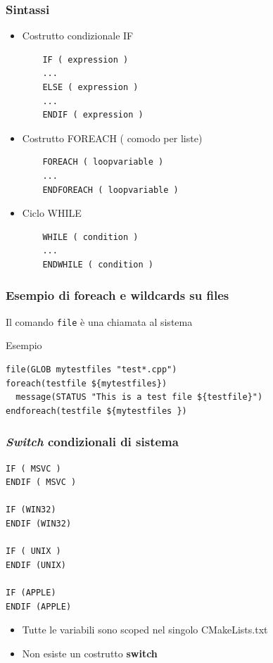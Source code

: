 \documentclass[10pt] {beamer}
\begin{document}
\begin{frame}[fragile]
	\frametitle{Sintassi}
\begin{itemize}
 \item Costrutto condizionale IF
	\begin{verbatim}
	IF ( expression )
	...
	ELSE ( expression )
	...
	ENDIF ( expression )
	\end{verbatim}
\item Costrutto FOREACH ( comodo per liste)
	\begin{verbatim}
	FOREACH ( loopvariable )
	...
	ENDFOREACH ( loopvariable )
	\end{verbatim}
\item Ciclo WHILE
	\begin{verbatim}
	WHILE ( condition )
	...
	ENDWHILE ( condition )
	\end{verbatim}
\end{itemize}
\end{frame}


\begin{frame}[fragile]
\frametitle{Esempio di foreach e wildcards su files}
Il comando \texttt{file} è una chiamata al sistema
\begin{block}{Esempio}
\begin{small}
\begin{verbatim}
file(GLOB mytestfiles "test*.cpp")
foreach(testfile ${mytestfiles})
  message(STATUS "This is a test file ${testfile}")
endforeach(testfile ${mytestfiles })
\end{verbatim}
\end{small}
\end{block}
\end{frame}


\begin{frame}[fragile]
\frametitle{\emph{Switch} condizionali di sistema}
\begin{verbatim}
IF ( MSVC )
ENDIF ( MSVC )

IF (WIN32)
ENDIF (WIN32)
 		
IF ( UNIX )
ENDIF (UNIX)
 		
IF (APPLE)
ENDIF (APPLE)
\end{verbatim}
\begin{itemize}
\item Tutte le variabili sono scoped nel singolo CMakeLists.txt
\item Non esiste un costrutto \textbf{switch}
\end{itemize}
\end{frame}
\end{document}
